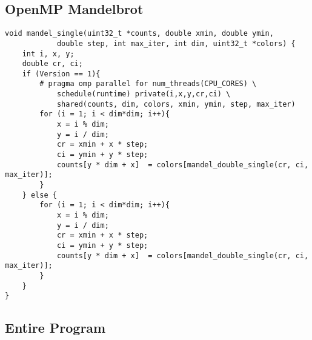 \documentclass{article}
\begin{document}
\subsection{OpenMP Mandelbrot}\label{appendix:omp}
\begin{lstlisting}
void mandel_single(uint32_t *counts, double xmin, double ymin,
            double step, int max_iter, int dim, uint32_t *colors) {
    int i, x, y;
    double cr, ci;
    if (Version == 1){
        # pragma omp parallel for num_threads(CPU_CORES) \
            schedule(runtime) private(i,x,y,cr,ci) \
            shared(counts, dim, colors, xmin, ymin, step, max_iter)
        for (i = 1; i < dim*dim; i++){
            x = i % dim;
            y = i / dim;
            cr = xmin + x * step;
            ci = ymin + y * step;
            counts[y * dim + x]  = colors[mandel_double_single(cr, ci, max_iter)];
        }
    } else {
        for (i = 1; i < dim*dim; i++){
            x = i % dim;
            y = i / dim;
            cr = xmin + x * step;
            ci = ymin + y * step;
            counts[y * dim + x]  = colors[mandel_double_single(cr, ci, max_iter)];
        }
    }
}
\end{lstlisting}

\subsection{Entire Program} \label{appendix:mandelbro.cu}


 

\end{document}
